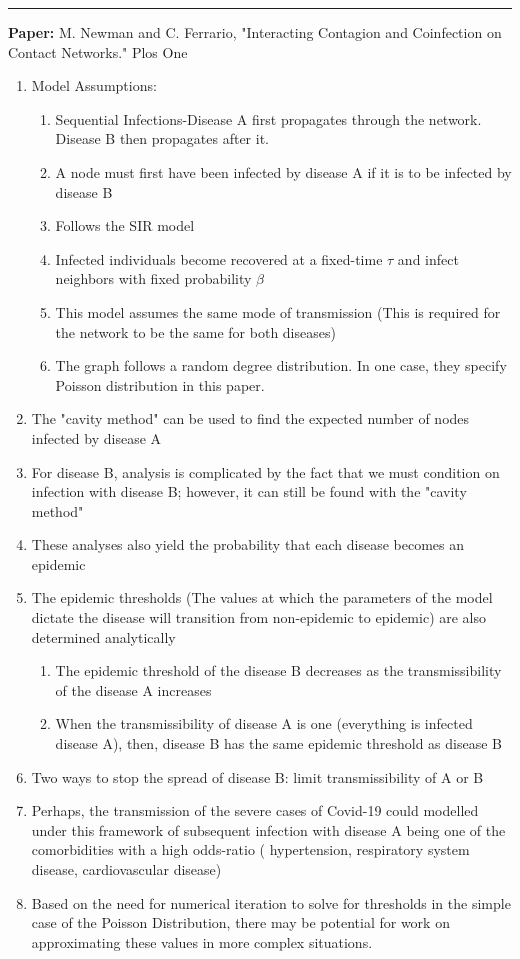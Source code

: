 \documentclass[11pt]{article}
\begin{document}
\smallskip
\noindent
\rule{\textwidth}{0.01in}
\textbf{Paper:} M. Newman and C. Ferrario, "Interacting Contagion and Coinfection on Contact Networks." Plos One
\begin{enumerate}
    \item Model Assumptions:
    \begin{enumerate}
        \item Sequential Infections-Disease A first propagates through the network. Disease B then propagates after it.
        \item A node must first have been infected by disease A if it is to be infected by disease B
        \item Follows the SIR model
        \item Infected individuals become recovered at a fixed-time $\tau$ and infect neighbors with fixed probability $\beta$
        \item This model assumes the same mode of transmission (This is required for the network to be the same for both diseases)
        \item The graph follows a random degree distribution. In one case, they specify Poisson distribution in this paper.
    \end{enumerate}
    \item The "cavity method" can be used to find the expected number of nodes infected by disease A
    \item For disease B, analysis is complicated by the fact that we must condition on infection with disease B; however, it can still be found with the "cavity method"
    \item These analyses also yield the probability that each disease becomes an epidemic
    \item The epidemic thresholds (The values at which the parameters of the model dictate the disease will transition from non-epidemic to epidemic) are also determined analytically
    \begin{enumerate}
        
        \item The epidemic threshold of the disease B decreases as the transmissibility of the disease A increases
        
        \item When the transmissibility of disease A is one (everything is infected disease A), then, disease B has the same epidemic threshold as disease B
        
    \end{enumerate}
    \item Two ways to stop the spread of disease B: limit transmissibility of A or B
    \item Perhaps, the transmission of the severe cases of Covid-19 could modelled under this framework of subsequent infection with disease A being one of the comorbidities with a high odds-ratio ( hypertension, respiratory system disease, cardiovascular
    disease)
    \item Based on the need for numerical iteration to solve for thresholds in the simple case of the Poisson Distribution, there may be potential for work on approximating these values in more complex situations. 
    

\end{enumerate}
\end{document}
